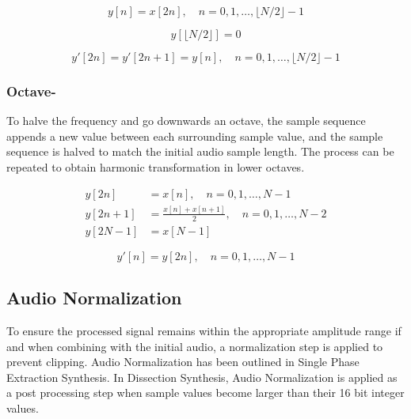 \documentclass[12pt,a4paper]{article}
\begin{document}
\begin{center}
\end{center}
\begin{equation*}
y[n] = x[2n], \quad n = 0, 1, \ldots, \lfloor N/2 \rfloor - 1
\end{equation*}

\begin{center}
\end{center}
\begin{equation*}
y[\lfloor N/2 \rfloor] = 0
\end{equation*}

\begin{center}
\end{center}
\begin{equation*}
y'[2n] = y'[2n+1] = y[n], \quad n = 0, 1, \ldots, \lfloor N/2 \rfloor - 1
\end{equation*}
\subsubsection{Octave-}
To halve the frequency and go downwards an octave, the sample sequence appends a new value between each surrounding sample value, and the sample sequence is halved to match the initial audio sample length. The process can be repeated to obtain harmonic transformation in lower octaves.

\begin{center}
\end{center}
\begin{align*}
y[2n] &= x[n], \quad n = 0, 1, \ldots, N-1 \\
y[2n+1] &= \frac{x[n] + x[n+1]}{2}, \quad n = 0, 1, \ldots, N-2 \\
y[2N-1] &= x[N-1]
\end{align*}

\begin{center}
\end{center}
\begin{equation*}
y'[n] = y[2n], \quad n = 0, 1, \ldots, N-1
\end{equation*}
\subsection{Audio Normalization}
To ensure the processed signal remains within the appropriate amplitude range if and when combining with the initial audio, a normalization step is applied to prevent clipping. Audio Normalization has been outlined in Single Phase Extraction Synthesis. \cite{DigitalDown2024B} In Dissection Synthesis, Audio Normalization is applied as a post processing step when sample values become larger than their 16 bit integer values.
\end{document}
